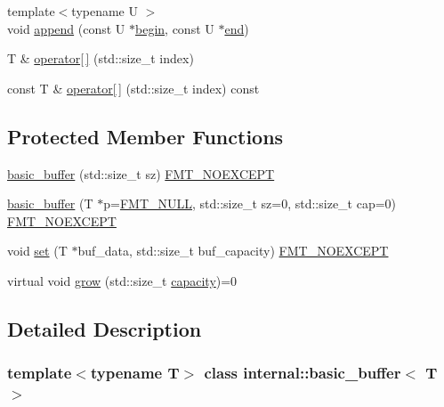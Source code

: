 \begin{DoxyCompactItemize}
{\footnotesize template$<$typename U $>$ }\\void \hyperlink{classinternal_1_1basic__buffer_aba7ea1a95a28bc123712f2fd24cf7414}{append} (const U $\ast$\hyperlink{classinternal_1_1basic__buffer_ae9d79a4d8c58625f46dfc48e95091bb4}{begin}, const U $\ast$\hyperlink{classinternal_1_1basic__buffer_ab9c6b3ee6d7189a86a6a3734c7597621}{end})
\item 
T \& \hyperlink{classinternal_1_1basic__buffer_a26cd6fa0b2b4a74f95e4e56acd2715b5}{operator\mbox{[}$\,$\mbox{]}} (std\+::size\+\_\+t index)
\item 
const T \& \hyperlink{classinternal_1_1basic__buffer_ad9101379d17c83684570cbbdb635b5c3}{operator\mbox{[}$\,$\mbox{]}} (std\+::size\+\_\+t index) const
\end{DoxyCompactItemize}
\subsection*{Protected Member Functions}
\begin{DoxyCompactItemize}
\item 
\hyperlink{classinternal_1_1basic__buffer_a3d47c3be3d6f4c06e53f0b5b213057a8}{basic\+\_\+buffer} (std\+::size\+\_\+t sz) \hyperlink{core_8h_aef128913e8400683b1cbd1a3a2e11df3}{F\+M\+T\+\_\+\+N\+O\+E\+X\+C\+E\+PT}
\item 
\hyperlink{classinternal_1_1basic__buffer_ac3cc34ee5942d68ea7b02ea4c2c07176}{basic\+\_\+buffer} (T $\ast$p=\hyperlink{core_8h_af7f827e50dd7667484c279ac1d38f30b}{F\+M\+T\+\_\+\+N\+U\+LL}, std\+::size\+\_\+t sz=0, std\+::size\+\_\+t cap=0) \hyperlink{core_8h_aef128913e8400683b1cbd1a3a2e11df3}{F\+M\+T\+\_\+\+N\+O\+E\+X\+C\+E\+PT}
\item 
void \hyperlink{classinternal_1_1basic__buffer_a0b603108f1aa614e64efaac6e081086d}{set} (T $\ast$buf\+\_\+data, std\+::size\+\_\+t buf\+\_\+capacity) \hyperlink{core_8h_aef128913e8400683b1cbd1a3a2e11df3}{F\+M\+T\+\_\+\+N\+O\+E\+X\+C\+E\+PT}
\item 
virtual void \hyperlink{classinternal_1_1basic__buffer_a01fbeed379e2af2c79baf5c9b5dc92e8}{grow} (std\+::size\+\_\+t \hyperlink{classinternal_1_1basic__buffer_ae88bfc1cb8c896fa0b689ad8158cccae}{capacity})=0
\end{DoxyCompactItemize}


\subsection{Detailed Description}
\subsubsection*{template$<$typename T$>$\newline
class internal\+::basic\+\_\+buffer$<$ T $>$}

